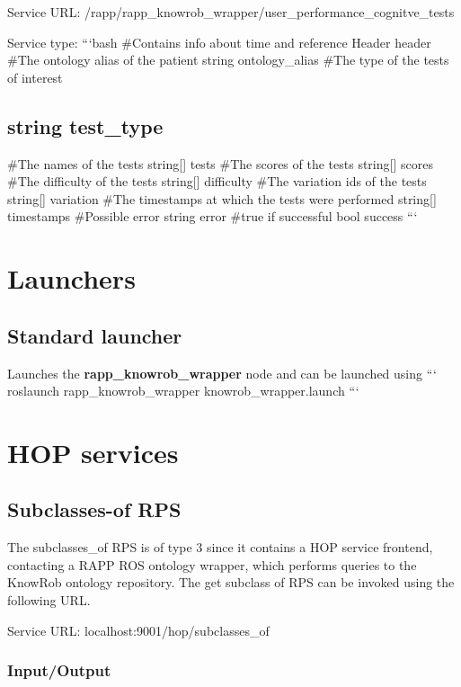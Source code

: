 Service U\-R\-L\-: {\ttfamily /rapp/rapp\-\_\-knowrob\-\_\-wrapper/user\-\_\-performance\-\_\-cognitve\-\_\-tests}

Service type\-: ```bash \#\-Contains info about time and reference Header header \#\-The ontology alias of the patient string ontology\-\_\-alias \#\-The type of the tests of interest \subsection*{string test\-\_\-type }

\#\-The names of the tests string\mbox{[}\mbox{]} tests \#\-The scores of the tests string\mbox{[}\mbox{]} scores \#\-The difficulty of the tests string\mbox{[}\mbox{]} difficulty \#\-The variation ids of the tests string\mbox{[}\mbox{]} variation \#\-The timestamps at which the tests were performed string\mbox{[}\mbox{]} timestamps \#\-Possible error string error \#true if successful bool success ```

\section*{Launchers}

\subsection*{Standard launcher}

Launches the {\bfseries rapp\-\_\-knowrob\-\_\-wrapper} node and can be launched using ``` roslaunch rapp\-\_\-knowrob\-\_\-wrapper knowrob\-\_\-wrapper.\-launch ```

\section*{H\-O\-P services}

\subsection*{Subclasses-\/of R\-P\-S}

The subclasses\-\_\-of R\-P\-S is of type 3 since it contains a H\-O\-P service frontend, contacting a R\-A\-P\-P R\-O\-S ontology wrapper, which performs queries to the Know\-Rob ontology repository. The get subclass of R\-P\-S can be invoked using the following U\-R\-L.

Service U\-R\-L\-: {\ttfamily localhost\-:9001/hop/subclasses\-\_\-of}

\subsubsection*{Input/\-Output}

